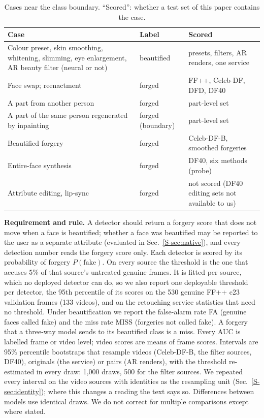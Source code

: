\documentclass[conference]{IEEEtran}
\begin{document}
\begin{table}[t]
\centering
\caption{Cases near the class boundary. ``Scored'': whether a test set of this paper contains the case.}
\label{tab:boundary}
\footnotesize
\setlength{\tabcolsep}{2.5pt}
\begin{tabular}{@{}>{\raggedright\arraybackslash}p{}>{\raggedright\arraybackslash}p{}>{\raggedright\arraybackslash}p{}@{}}
\toprule
Case & Label & Scored \\
\midrule
Colour preset, skin smoothing, whitening, slimming, eye enlargement, AR beauty filter (neural or not) & beautified & presets, filters, AR renders, one service \\
Face swap; reenactment & forged & FF++, Celeb-DF, DFD, DF40 \\
A part from another person & forged & part-level set \\
A part of the same person regenerated by inpainting & forged (boundary) & part-level set \\
Beautified forgery & forged & Celeb-DF-B, smoothed forgeries \\
Entire-face synthesis & forged & DF40, six methods (probe) \\
Attribute editing, lip-sync & forged & not scored (DF40 editing sets not available to us) \\
\bottomrule
\end{tabular}
\end{table}

\textbf{Requirement and rule.} A detector should return a forgery score that does not move when a face is beautified; whether a
face was beautified may be reported to the user as a separate attribute (evaluated in Sec.~\ref{S-sec:native}), and every
detection number reads the forgery score only. Each detector is
scored by its probability of forgery $P(\text{fake})$. On every source the threshold is the one that accuses 5\% of that
source's untreated genuine frames. It is fitted per source, which no deployed detector can do, so we also report one
deployable threshold per detector, the 95th percentile of its scores on the 530 genuine FF++ c23 validation frames (133 videos),
and on the retouching service statistics that need no threshold. Under
beautification we report the false-alarm rate FA (genuine faces called fake) and the miss rate MISS (forgeries not called
fake). A forgery that a three-way model sends to its beautified class is a miss. Every AUC is labelled frame or video level;
video scores are means of frame scores. Intervals are 95\% percentile bootstraps that resample videos (Celeb-DF-B, the filter
sources, DF40), originals (the service) or pairs (AR renders), with the threshold re-estimated in every draw: 1,000 draws, 500
for the filter sources. We repeated every interval on the video sources with identities as the resampling unit
(Sec.~\ref{S-sec:identity}); where this changes a reading the text says so. Differences between models use identical
draws. We do not correct for multiple comparisons except where stated.
\end{document}
